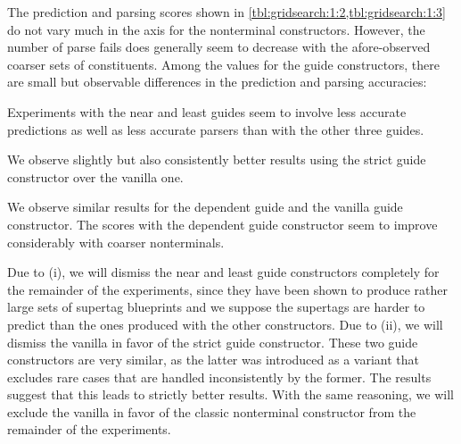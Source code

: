 \documentclass[../../document.tex]{subfiles}
\begin{document}
    The prediction and parsing scores shown in \cref{tbl:gridsearch:1:2,tbl:gridsearch:1:3} do not vary much in the axis for the nonterminal constructors.
    However, the number of parse fails does generally seem to decrease with the afore-observed coarser sets of constituents.
    Among the values for the guide constructors, there are small but observable differences in the prediction and parsing accuracies:
    \begin{compactenum}
        \item Experiments with the near and least guides seem to involve less accurate predictions as well as less accurate parsers than with the other three guides.
        \item We observe slightly but also consistently better results using the strict guide constructor over the vanilla one.
        \item We observe similar results for the dependent guide and the vanilla guide constructor. The scores with the dependent guide constructor seem to improve considerably with coarser nonterminals.
    \end{compactenum}

    Due to (i), we will dismiss the near and least guide constructors completely for the remainder of the experiments, since they have been shown to produce rather large sets of supertag blueprints and we suppose the supertags are harder to predict than the ones produced with the other constructors.
    Due to (ii), we will dismiss the vanilla in favor of the strict guide constructor.
    These two guide constructors are very similar, as the latter was introduced as a variant that excludes rare cases that are handled inconsistently by the former.
    The results suggest that this leads to strictly better results.
    With the same reasoning, we will exclude the vanilla in favor of the classic nonterminal constructor from the remainder of the experiments.
    
\end{document}
